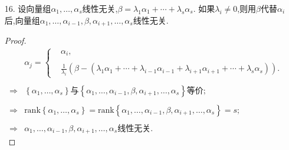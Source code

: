 \documentclass{article}
\begin{document}
\begin{enumerate}
\begin{proof}
\begin{enumerate}
            由$\alpha_1,\ldots,\alpha_s$线性相关,得$\exists\ \alpha_i=\sum\limits_{j\neq i} \lambda_j \alpha_j$,且$\lambda_j$不全为0.

            取$k=\max \left\{\ j\ | \  \lambda_j\neq 0\right\}$,
            \begin{enumerate}
                \item [(a)]$k<i$.矛盾,不存在这样的非零向量组.
                \item [(b)]$k>i$.则有$\alpha_k=\alpha_i-\sum\limits_{j\neq k,i} \alpha_j$,矛盾,不存在这样的非零向量组.
            \end{enumerate}
            即假设不成立,充分性即证.
        \end{enumerate}
        综上,即证非零向量组$\alpha_1,\ldots,\alpha_s$线性无关的充要条件是，每个$\alpha_i(1<i\leqslant s)$都不能用它面前的向量线性表示.
    \end{proof}
    \item [16.]设向量组$\alpha_1,\ldots,\alpha_s$线性无关,$\beta=\lambda_1 \alpha_1 +\cdots+\lambda_s \alpha_s$.
    如果$\lambda_i \neq 0$,则用$\beta$代替$\alpha_i$后,向量组$\alpha_1,\ldots,\alpha_{i-1},\beta,\alpha_{i+1},\ldots,\alpha_s$线性无关.
    \begin{proof}
        \begin{align*}
            &\alpha_j=\begin{cases}
                & \alpha_i,\\
                & \\
                & \displaystyle{\frac{1}{\lambda_i}}\left(\beta-\left(\lambda_1 \alpha_1+\cdots+\lambda_{i-1} \alpha_{i-1}+\lambda_{i+1} \alpha_{i+1}+\cdots+\lambda_s \alpha_s\right)\right).            
            \end{cases}\\
            & \\
            \Rightarrow
            &\left\{\alpha_1,\ldots,\alpha_s\right\}\mbox{与}
            \left\{\alpha_1,\ldots,\alpha_{i-1},\beta,\alpha_{i+1},\ldots,\alpha_s\right\}
            \mbox{等价};\\
            & \\
            \Rightarrow
            &\mbox{rank}\left\{\alpha_1,\ldots,\alpha_s\right\}=
            \mbox{rank}\left\{\alpha_1,\ldots,\alpha_{i-1},\beta,\alpha_{i+1},\ldots,\alpha_s\right\}=s;\\
            & \\
            \Rightarrow
            &\alpha_1,\ldots,\alpha_{i-1},\beta,\alpha_{i+1},\ldots,\alpha_s\mbox{线性无关}.
        \end{align*}
    \end{proof}
\end{enumerate}
\end{document}
